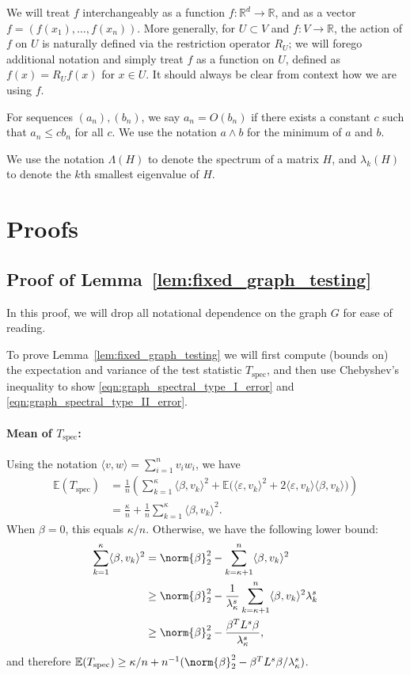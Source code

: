 \documentclass{article}
\newcommand{\Reals}{\mathbb{R}}
\newcommand{\1}{\mathbf{1}}
\newcommand{\Rd}{\Reals^d}
\newcommand{\Ebb}{\mathbb{E}}
\newcommand{\dotp}[2]{\langle #1, #2 \rangle}
\newcommand{\spec}{\mathrm{spec}}
\theoremstyle{alden}
\theoremstyle{aldenthm}
\theoremstyle{definition}
\theoremstyle{remark}
\begin{document}
We will treat $f$ interchangeably as a function $f:\Rd \to \Reals$, and as a vector $f = (f(x_1),\ldots,f(x_n))$. More generally, for $U \subset V$ and $f:V \to \Reals$, the action of $f$ on $U$ is naturally defined via the restriction operator $R_U$; we will forego additional notation and simply treat $f$ as a function on $U$, defined as $f(x) = R_Uf(x)$ for $x \in U$. It should always be clear from context how we are using $f$. 

For sequences $(a_n), (b_n)$, we say $a_n = O(b_n)$ if there exists a constant $c$ such that $a_n \leq cb_n$ for all $c$. We use the notation $a \wedge b$ for the minimum of $a$ and $b$.

We use the notation $\Lambda(H)$ to denote the spectrum of a matrix $H$, and $\lambda_k(H)$ to denote the $k$th smallest eigenvalue of $H$.


\section{Proofs}

\subsection{Proof of Lemma~\ref{lem:fixed_graph_testing}}

In this proof, we will drop all notational dependence on the graph $G$ for ease of reading. 

To prove Lemma~\ref{lem:fixed_graph_testing} we will first compute (bounds on) the expectation and variance of the test statistic $T_{\mathrm{spec}}$, and then use Chebyshev's inequality to show \eqref{eqn:graph_spectral_type_I_error} and \eqref{eqn:graph_spectral_type_II_error}.

\paragraph{Mean of $T_{\mathrm{spec}}$:} Using the notation $\dotp{v}{w} = \sum_{i = 1}^{n} v_iw_i$, we have
\begin{align*}
\Ebb(T_{\spec}) & = \frac{1}{n}\left(\sum_{k = 1}^{\kappa} \dotp{\beta}{v_k}^2 + \Ebb\bigl( \dotp{\varepsilon}{v_k}^2 + 2 \dotp{\varepsilon}{v_k} \dotp{\beta}{v_k}\bigr)\right) \\
& = \frac{\kappa}{n} + \frac{1}{n}\sum_{k = 1}^{\kappa}\dotp{\beta}{v_k}^2.
\end{align*}
When $\beta = 0$, this equals $\kappa/n$. Otherwise, we have the following lower bound:
\begin{align*}
\sum_{k = 1}^{\kappa}\dotp{\beta}{v_k}^2 & = \norm{\beta}_2^2 - \sum_{k = \kappa + 1}^{n} \dotp{\beta}{v_k}^2 \\
& \geq \norm{\beta}_2^2 - \frac{1}{\lambda_{\kappa}^s}\sum_{k = \kappa + 1}^{n} \dotp{\beta}{v_k}^2 \lambda_k^s \\
& \geq \norm{\beta}_2^2 - \frac{\beta^T L^s \beta}{\lambda_{\kappa}^s},
\end{align*}
and therefore $\Ebb(T_{\spec}) \geq \kappa/n + n^{-1}(\norm{\beta}_2^2 - \beta^T L^s \beta/\lambda_{\kappa}^s)$. 
\end{document}
